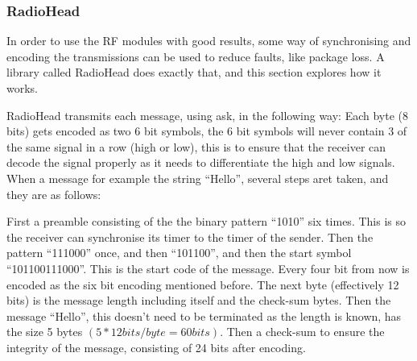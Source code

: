 \subsubsection{RadioHead}\label{subsubsec:RadioHead}

In order to use the RF modules with good results, some way of synchronising and encoding the transmissions can be used to reduce faults, like package loss.
A library called RadioHead does exactly that, and this section explores how it works.

RadioHead transmits each message, using \gls{ask}, in the following way:
Each byte (8 bits) gets encoded as two 6 bit symbols, the 6 bit symbols will never contain 3 of the same signal in a row (high or low), this is to ensure that the receiver can decode the signal properly as it needs to differentiate the high and low signals.
When a message for example the string \enquote{Hello}, several steps aret taken, and they are as follows:

First a preamble consisting of the the binary pattern \enquote{1010} six times. 
This is so the receiver can synchronise its timer to the timer of the sender.
Then the pattern \enquote{111000} once, and then \enquote{101100}, and then the start symbol \enquote{101100111000}. 
This is the start code of the message. 
Every four bit from now is encoded as the six bit encoding mentioned before.
The next byte (effectively 12 bits) is the message length including itself and the check-sum bytes.
Then the message \enquote{Hello}, this doesn't need to be terminated as the length is known, has the size 5 bytes $(5 * 12 bits/byte = 60 bits)$.
Then a check-sum to ensure the integrity of the message, consisting of 24 bits after encoding.

